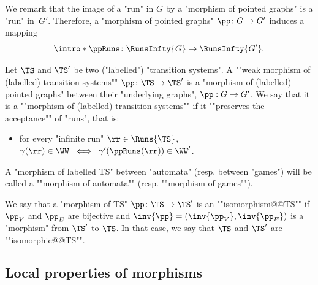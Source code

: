 \documentclass[10pt,a4paper]{amsart}
\renewcommand{\gg}{\gamma}
\begin{document}
\AP We remark that the image of a "run" in $G$ by a "morphism of pointed graphs" is a "run" in~$G'$. Therefore, a "morphism of pointed graphs" $\pp\colon G \to G'$ induces a mapping \[\intro*\ppRuns\colon \RunsInfty{G}\to \RunsInfty{G'}.\] %


\begin{definition}\label{def:morphism_transition_systems}
	\AP Let $\TS$ and $\TS'$ be two ("labelled") "transition systems". A ""weak morphism of (labelled) transition systems"" $\pp\colon \TS \to \TS'$ is a "morphism of (labelled) pointed graphs" between their "underlying graphs", $\pp: G \to G'$.
	\AP We say that it is a ""morphism of (labelled) transition systems"" if it ""preserves the acceptance"" of "runs", that is:
	\begin{itemize}
		\item for every "infinite run" $\rr \in \Runs{\TS}$,  $\gg(\rr) \in \WW \; \iff \; \gg'(\ppRuns(\rr)) \in \WW'$. 
	\end{itemize}
\end{definition}

\AP A "morphism of labelled TS" between "automata" (resp. between "games") will be called a ""morphism of automata"" (resp. ""morphism of games"").

\AP We say that a "morphism of TS" $\pp\colon \TS \to \TS'$ is an ""isomorphism@@TS"" if $\pp_V$ and $\pp_E$ are bijective and $\inv{\pp} = (\inv{\pp_V}, \inv{\pp_E})$ is a "morphism" from $\TS'$ to $\TS$. In that case, we say that $\TS$ and $\TS'$ are ""isomorphic@@TS"".

\subsection{Local properties of morphisms}\label{subsect-morp: loc-bijective-morphisms}
\end{document}
